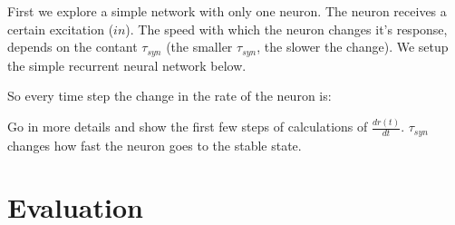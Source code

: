 First we explore a simple network with only one neuron. The neuron receives a certain excitation ($in$). The speed with which the neuron changes it's response, depends on the contant $\tau_{syn}$ (the smaller $\tau_{syn}$, the slower the change). We setup the simple recurrent neural network below.


So every time step the change in the rate of the neuron is:



Go in more details and show the first few steps of calculations of $\frac{dr(t)}{dt}$. $\tau_{syn}$ changes how fast the neuron goes to the stable state.

\chapter{Evaluation}


